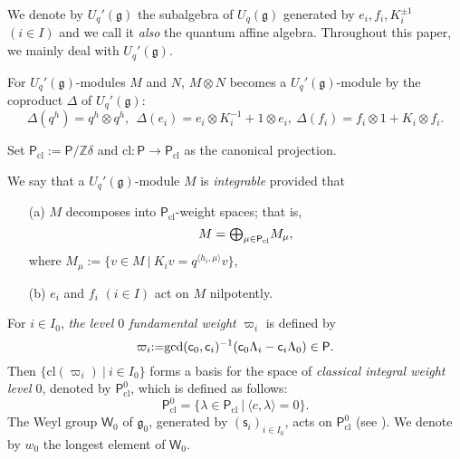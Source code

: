 \documentclass[11pt, leqno]{amsart}
\theoremstyle{definition}
\numberwithin{equation}{section}
\begin{document}
We denote by $U_q'({\mathfrak g})$ the subalgebra of $U_q({\mathfrak g})$ generated by
$e_i,f_i,K^{\pm 1}_i$ $(i \in I)$ and we call it {\it also} the quantum
affine algebra. Throughout this paper, we mainly deal with
$U_q'({\mathfrak g})$.

For ${U_q'({\mathfrak g})}$-modules $M$ and $N$, $M \otimes N$ becomes a ${U_q'({\mathfrak g})}$-module by the coproduct $\Delta$ of ${U_q'({\mathfrak g})}$:
$$ \Delta(q^h)=q^h {\mathop\otimes} q^h, \ \ \Delta(e_i)=e_i {\mathop\otimes} K_i^{-1}+1 {\mathop\otimes} e_i, \ \Delta(f_i)=f_i {\mathop\otimes} 1 +K_i {\mathop\otimes} f_i.$$

Set ${\mathsf{P}}_{\mathrm{cl}} {\mathbin{:=}} {\mathsf{P}} / {\mathbb Z} \delta$ and ${\mathrm{cl}} \colon {\mathsf{P}} \to {\mathsf{P}}_{\mathrm{cl}}$ as the canonical projection.

We say that a ${U_q'({\mathfrak g})}$-module $M$ is {\it integrable} provided that
\begin{enumerate}
\item[({\rm a})] $M$ decomposes into ${\mathsf{P}}_{\mathrm{cl}}$-weight spaces; that is,
$$ M = {\mathop{\mbox{\normalsize$\bigoplus$}}\limits}_{ \mu \in {\mathsf{P}}_{\mathrm{cl}}} M_\mu, $$
where $M_\mu {\mathbin{:=}} \{ v \in M \ | \ K_i v = q^{\langle h_i, \mu \rangle } v \}$,
\item[({\rm b})] $e_i$ and $f_i$ $(i \in I)$ act on $M$ nilpotently.
\end{enumerate}

For $i \in I_0$, {\it the level $0$ fundamental weight} ${\varpi}_i$ is defined by
$$ {\varpi}_i {\mathbin{:=}} {\rm gcd}(\mathsf{c}_0,\mathsf{c}_i)^{-1}(\mathsf{c}_0\Lambda_i-\mathsf{c}_i\Lambda_0) \in {\mathsf{P}}.$$
Then $\{ {\mathrm{cl}}({\varpi}_i) \ | \ i \in I_0 \}$ forms a basis for the space of {\it classical integral weight level $0$},
denoted by ${\mathsf{P}}^0_{\mathrm{cl}}$, which is defined as follows:
$$ {\mathsf{P}}^0_{\mathrm{cl}} = \{ \lambda \in {\mathsf{P}}_{\mathrm{cl}} \ | \ \langle c,\lambda \rangle =0  \}.$$
The Weyl group $\mathsf{W}_0$ of ${\mathfrak g}_0$, generated by $(\mathsf{s}_i)_{i \in I_0}$, acts on ${\mathsf{P}}^0_{\mathrm{cl}}$ (see \cite[\S 1.2]{AK}).
We denote by $w_0$ the longest element of $\mathsf{W}_0$.
\end{document}
